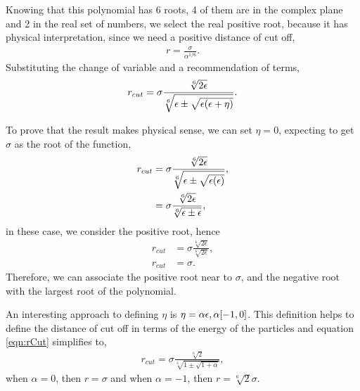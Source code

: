 \documentclass[main.tex]{subfiles}
\begin{document}
Knowing that this polynomial has 6 roots, 4 of them are in the complex plane and 2 in the real set of numbers, we select the real positive root, because it has physical interpretation, since we need a positive distance of cut off,
\begin{gather*}
    r = \frac{\sigma}{\alpha^{1/6}}.
\end{gather*}
Substituting the change of variable and a recommendation of terms,
\begin{gather}
    r_{cut} = \sigma \frac{\sqrt[6]{2\epsilon}}{\sqrt[6]{\epsilon\pm\sqrt{\epsilon\qty(\epsilon+\eta)}}}. \label{eqn:rCut}
\end{gather}

To prove that the result makes physical sense, we can set $\eta = 0$, expecting to get $\sigma$ as the root of the function,
\begin{align*}
    r_{cut} &= \sigma \frac{\sqrt[6]{2\epsilon}}{\sqrt[6]{\epsilon\pm\sqrt{\epsilon\qty(\epsilon)}}}, \\
      &= \sigma \frac{\sqrt[6]{2\epsilon}}{\sqrt[6]{\epsilon\pm\epsilon}},
\end{align*}
in these case, we consider the positive root, hence
\begin{align*}
    r_{cut} &= \sigma\frac{\sqrt[6]{2\epsilon}}{\sqrt[6]{2\epsilon}}, \\
    r_{cut} &= \sigma.
\end{align*}
Therefore, we can associate the positive root near to $\sigma$, and the negative root with the largest root of the polynomial.

An interesting approach to defining $\eta$ is $\eta = \alpha\epsilon,\alpha\qty[-1,0]$.
This definition helps to define the distance of cut off in terms of the energy of the particles and equation \ref{eqn:rCut} simplifies to,
\begin{gather}
    r_{cut} = \sigma\frac{\sqrt[6]{2}}{\sqrt[6]{1\pm\sqrt{1+\alpha}}}\label{eqn:rCutf},
\end{gather}
when $\alpha=0$, then $r=\sigma$ and when $\alpha=-1$, then $r=\sqrt[6]{2}\sigma$.
\end{document}
